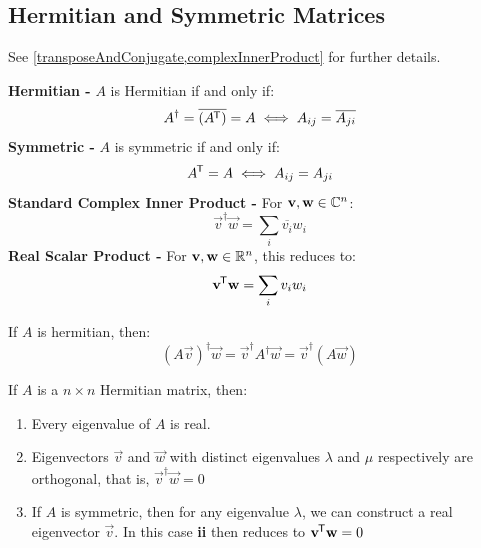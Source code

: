 \documentclass[../main.tex]{subfiles}
\begin{document}
\subsection{Hermitian and Symmetric Matrices}
\begin{remark}[Recap] See \cref{transposeAndConjugate,complexInnerProduct} for further details.\par
  \textbf{Hermitian -} $A$ is Hermitian if and only if:
  \[
    A^{\dag} = \overline{(A^{{\mkern-1.5mu\mathsf{T}}})} = A \iff A_{i j} = \overline{A_{j i}}
  \]
  \textbf{Symmetric -} $A$ is symmetric if and only if:
  \[
    A^{{\mkern-1.5mu\mathsf{T}}} = A \iff A_{i j} = A_{j i}
  \]
  \textbf{Standard Complex Inner Product -} For $\mathbf{\bm{v}}, \mathbf{\bm{w}} \in \mathbb{C}^{n}$:
  \[
    \vec{v}^{\dag}\vec{w} = \sum_{i} \overline{v_i}w_i
  \]
  \textbf{Real Scalar Product - } For $\mathbf{\bm{v}}, \mathbf{\bm{w}} \in \mathbb{R}^{n}$, this reduces to:
  \[
    \mathbf{\bm{v}}^{{\mkern-1.5mu\mathsf{T}}}\mathbf{\bm{w}} = \sum_{i} v_i w_i
  \]
\end{remark}
\begin{remark}
  If $A$ is hermitian, then:
  \[
    (A \vec{v})^{\dag}\vec{w} = \vec{v}^{\dag} A^{\dag} \vec{w} = \vec{v}^{\dag}(A\vec{w})
  \]
\end{remark}
\begin{theorem}
  If $A$ is a $n \times n$ Hermitian matrix, then: \label{hermitianProperties}
  \begin{enumerate}
    \item Every eigenvalue of $A$ is real.
    \item Eigenvectors $\vec{v}$ and $\vec{w}$ with distinct eigenvalues $\lambda$ and $\mu$ respectively are orthogonal, that is, $\vec{v}^{\dag} \vec{w} = 0$
    \item If $A$ is symmetric, then for any eigenvalue $\lambda$, we can construct a real eigenvector $\vec{v}$.
      In this case \textbf{ii} then reduces to $\mathbf{\bm{v}}^{{\mkern-1.5mu\mathsf{T}}} \mathbf{\bm{w}} = 0$
  \end{enumerate}
\end{theorem}
\end{document}

